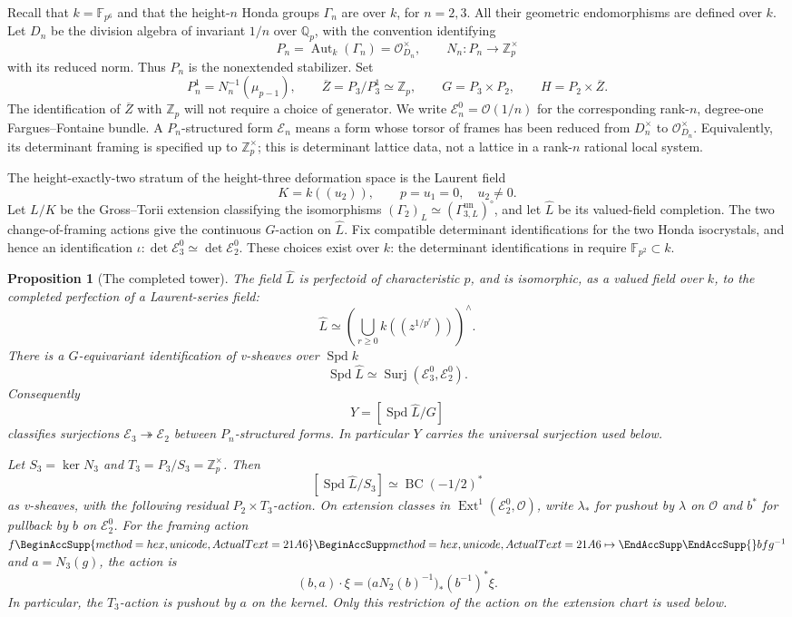 \documentclass[11pt]{article}
\numberwithin{equation}{section}
\newtheorem{proposition}[theorem]{Proposition}
\theoremstyle{definition}
\theoremstyle{remark}
\newcommand{\Q}{\mathbb Q}
\newcommand{\Z}{\mathbb Z}
\newcommand{\F}{\mathbb F}
\newcommand{\cO}{\mathcal O}
\DeclareMathOperator{\Aut}{Aut}
\DeclareMathOperator{\Spd}{Spd}
\let\UnicodeOriginalMapsto\mapsto
\DeclareRobustCommand{\mapsto}{
  \BeginAccSupp{method=hex,unicode,ActualText=21A6}
  \UnicodeOriginalMapsto\EndAccSupp{}}
\begin{document}
Recall that $k=\F_{p^6}$ and that the height-$n$ Honda groups $\Gamma_n$ are over $k$,
for $n=2,3$.  All their geometric endomorphisms are defined over $k$.
Let $D_n$ be the division algebra of invariant $1/n$ over $\Q_p$, with
the convention identifying
\[
 P_n=\Aut_k(\Gamma_n)=\cO_{D_n}^{\times},\qquad
 N_n:P_n\longrightarrow\Z_p^{\times}
\]
with its reduced norm.  Thus $P_n$ is the nonextended stabilizer.  Set
\[
 P_n^1=N_n^{-1}(\mu_{p-1}),\qquad
 \overline Z=P_3/P_3^1\simeq\Z_p,\qquad
 G=P_3\times P_2,\qquad H=P_2\times\overline Z.
\]
The identification of $\overline Z$ with $\Z_p$ will not require a choice
of generator.  We write $\mathcal E_n^0=\cO(1/n)$ for the corresponding
rank-$n$, degree-one Fargues--Fontaine bundle.  A $P_n$-structured form
$\mathcal E_n$ means a form whose torsor of frames has been reduced from
$D_n^{\times}$ to $\cO_{D_n}^{\times}$.  Equivalently, its determinant
framing is specified up to $\Z_p^{\times}$; this is determinant lattice
data, not a lattice in a rank-$n$ rational local system.

The height-exactly-two stratum of the height-three deformation space is
the Laurent field
\[
 K=k((u_2)),\qquad p=u_1=0,\quad u_2\ne0.
\]
Let $L/K$ be the Gross--Torii extension classifying the isomorphisms
$(\Gamma_2)_L\simeq(\Gamma^{\mathrm{un}}_{3,L})^{\circ}$, and let
$\widehat L$ be its valued-field completion.  The two change-of-framing
actions give the continuous $G$-action on $\widehat L$.  Fix compatible
determinant identifications for the two Honda isocrystals, and hence an
identification
$\iota:\det\mathcal E_3^0\simeq\det\mathcal E_2^0$.
These choices exist over $k$: the determinant identifications in
\cite[\S2.7]{BMR2026} require $\F_{p^2}\subset k$.

\begin{proposition}[The completed tower]\label{prop:tower}
The field $\widehat L$ is perfectoid of characteristic $p$, and is
isomorphic, as a valued field over $k$, to the completed perfection of a
Laurent-series field:
\[
 \widehat L\simeq
 \left(\bigcup_{r\ge0}k((z^{1/p^r}))\right)^{\wedge}.
\]
There is a $G$-equivariant identification of v-sheaves over $\Spd k$
\[
 \Spd\widehat L\simeq
 \operatorname{Surj}(\mathcal E_3^0,\mathcal E_2^0).
\]
Consequently
\[
 Y=[\Spd\widehat L/G]
\]
classifies surjections $\mathcal E_3\twoheadrightarrow\mathcal E_2$
between $P_n$-structured forms.  In particular $Y$ carries the universal
surjection used below.

Let $S_3=\ker N_3$ and $T_3=P_3/S_3=\Z_p^{\times}$.  Then
\[
 [\Spd\widehat L/S_3]
 \simeq\operatorname{BC}(-1/2)^*
\]
as v-sheaves, with the following residual $P_2\times T_3$-action.
On extension classes in $\operatorname{Ext}^1(\mathcal E_2^0,\cO)$,
write $\lambda_*$ for pushout by $\lambda$ on $\cO$ and $b^*$ for
pullback by $b$ on $\mathcal E_2^0$.  For the framing action
$f\mapsto bfg^{-1}$ and $a=N_3(g)$, the action is
\[
 (b,a)\cdot\xi
   =\bigl(aN_2(b)^{-1}\bigr)_*(b^{-1})^*\xi.
\]
In particular, the $T_3$-action is pushout by $a$ on the kernel.
Only this restriction of the action on the extension chart is used below.
\end{proposition}
\end{document}
